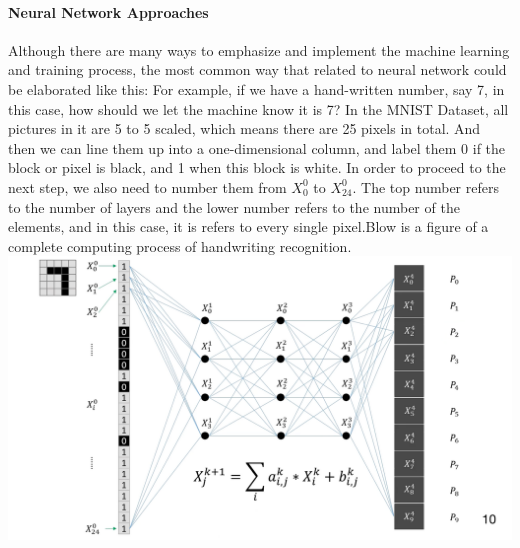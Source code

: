 \documentclass[12pt]{article}
\begin{document}
\paragraph{Neural Network Approaches}
Although there are many ways to emphasize and implement the machine learning and training process, the most common way that related to neural network could be elaborated like this: For example, if we have a hand-written number, say 7, in this case, how should we let the machine know it is 7? In the MNIST Dataset, all pictures in it are 5 to 5 scaled, which means there are 25 pixels in total. And then we can line them up into a one-dimensional column, and label them 0 if the block or pixel is black, and 1 when this block is white. In order to proceed to the next step, we also need to number them from $X^{0}_{0}$ to $X^{0}_{24}$. The top number refers to the number of layers and the lower number refers to the number of the elements, and in this case, it is refers to every single pixel.Blow is a figure of a complete computing process of handwriting recognition.
\vspace{10pt}
\includegraphics[page = 1, width=\linewidth]{Neural Networks Exemplar.pdf}
\end{document}
